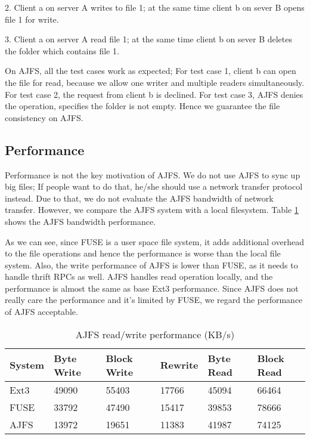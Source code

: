 2. Client a on server A writes to file 1; at the same time client b on sever B opens file 1 for write.

3. Client a on server A read file 1; at the same time client b on sever B deletes the folder which contains file 1.

On AJFS, all the test cases work as expected; For test case 1, client b can open the file for read, because we allow one writer and multiple readers simultaneously. For test case 2, the request from client b is declined. For test case 3, AJFS denies the operation, specifies the folder is not empty. Hence we guarantee the file consistency on AJFS.

\subsection{Performance}

Performance is not the key motivation of AJFS. We do not use AJFS to sync up big files; If people want to do that, he/she should use a network transfer protocol instead. Due to that, we do not evaluate the AJFS bandwidth of network transfer.
However, we compare the AJFS system with a local filesystem. Table \ref{table:performance} shows the AJFS bandwidth performance. 

As we can see, since FUSE is a user space file system, it adds additional overhead to the file operations and hence the performance is worse than the local file system.
Also, the write performance of AJFS is lower than FUSE, as it needs to handle thrift RPCs as well. AJFS handles read operation locally, and the performance is almost the same as base Ext3 performance.
Since AJFS does not really care the performance and it's limited by FUSE, we regard the performance of AJFS acceptable. 


\begin{table}[Ht]
\caption{AJFS read/write performance (KB/s)}
\centering
\begin{tabular}{|p{0.9cm}|p{0.9cm}|p{0.9cm}|p{0.9cm}|p{0.9cm}|p{0.9cm}|}
\hline\hline
System & Byte Write & Block Write & Rewrite & Byte Read & Block Read \\
\hline
Ext3	& 49090	& 55403	& 17766	& 45094	& 66464	\\
\hline
FUSE	& 33792	& 47490	& 15417	& 39853	& 78666	\\
\hline
AJFS	& 13972	& 19651	& 11383	& 41987	& 74125	\\
\hline
\end{tabular}
\label{table:performance}
\end{table}

